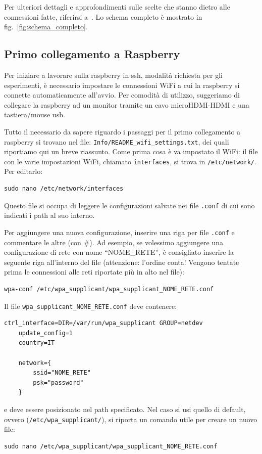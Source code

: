 Per ulteriori dettagli e approfondimenti sulle scelte che stanno dietro alle connessioni fatte, riferirsi a~\cite{ptvlocalizzazione}.
Lo schema completo è mostrato in fig.~\ref{fig:schema_completo}.

\subsection{Primo collegamento a Raspberry}
\label{sez: primo collegamento a raspberry}

Per iniziare a lavorare sulla raspberry in ssh, modalità richiesta per gli esperimenti, è necessario impostare le connessioni WiFi a cui la raspberry si
connette automaticamente all'avvio. Per comodità di utilizzo, suggeriamo di collegare la raspberry ad un monitor tramite un cavo microHDMI-HDMI e una 
tastiera/mouse usb.

Tutto il necessario da sapere riguardo i passaggi per il primo collegamento a raspberry si trovano nel file: \texttt{Info/README\_wifi\_settings.txt}, dei quali 
riportiamo qui un breve riassunto.
Come prima cosa è va impostato il WiFi: il file con le varie impostazioni WiFi, chiamato \texttt{interfaces}, si trova in \texttt{/etc/network/}. Per editarlo:
\begin{lstlisting}[style=bash]
	sudo nano /etc/network/interfaces
\end{lstlisting}
Questo file si occupa di leggere le configurazioni salvate nei file \texttt{.conf} di cui sono indicati i path al suo interno. 

Per aggiungere una nuova configurazione, inserire una riga per file \texttt{.conf} e commentare le altre (con \#).
Ad esempio, se volessimo aggiungere una configurazione di rete con nome ``NOME\_RETE'', \`e consigliato inserire la seguente riga all'interno del file 
(attenzione: l'ordine conta! Vengono tentate prima le connessioni alle reti riportate più in alto nel file):
\begin{lstlisting}[style=xml]
	wpa-conf /etc/wpa_supplicant/wpa_supplicant_NOME_RETE.conf
\end{lstlisting}
Il file \verb|wpa_supplicant_NOME_RETE.conf| deve contenere:
\begin{lstlisting}[style=xml]
	ctrl_interface=DIR=/var/run/wpa_supplicant GROUP=netdev
	update_config=1
	country=IT

	network={
		ssid="NOME_RETE"
		psk="password"
	}
\end{lstlisting}
e deve essere posizionato nel path specificato. 
Nel caso si usi quello di default, ovvero (\texttt{/etc/wpa\_supplicant/}), si riporta un comando utile per creare un nuovo file:
\begin{lstlisting}[style=bash]
	sudo nano /etc/wpa_supplicant/wpa_supplicant_NOME_RETE.conf
\end{lstlisting}

